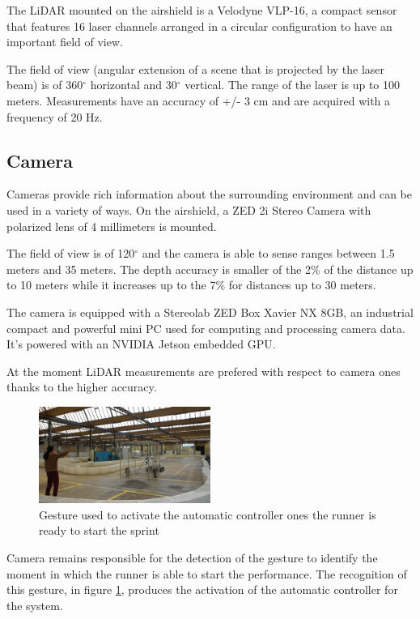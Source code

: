 \documentclass[a4paper,12pt,oneside]{book}
\begin{document}
The LiDAR mounted on the airshield is a Velodyne VLP-16, a compact sensor that features 16 laser channels arranged in a circular configuration to have an important field of view.

The field of view (angular extension of a scene that is projected by the laser beam) is of 360$^\circ$ horizontal and 30$^\circ$ vertical.
The range of the laser is up to 100 meters. 
Measurements have an accuracy of +/- 3 cm and are acquired with a frequency of 20 Hz.

\subsection*{Camera}
Cameras provide rich information about the surrounding environment and can be used in a variety of ways.
On the airshield, a ZED 2i Stereo Camera with polarized lens of 4 millimeters is mounted.

The field of view is of 120$^\circ$ and the camera is able to sense ranges between 1.5 meters and 35 meters. 
The depth accuracy is smaller of the 2\% of the distance up to 10 meters while it increases up to the 7\% for distances up to 30 meters.

The camera is equipped with a Stereolab ZED Box Xavier NX 8GB, an industrial compact and powerful mini PC used for computing and processing camera data.
It's powered with an NVIDIA Jetson embedded GPU.

At the moment LiDAR measurements are prefered with respect to camera ones thanks to the higher accuracy.

\begin{figure}[h!]
	\centering
	\includegraphics[width=0.5\textwidth]{Gesture.png}
\caption{Gesture used to activate the automatic controller ones the runner is ready to start the sprint}
\label{gesture}
\end{figure}

Camera remains responsible for the detection of the gesture to identify the moment in which the runner is able to start the performance. 
The recognition of this gesture, in figure \ref{gesture}, produces the activation of the automatic controller for the system.
\end{document}
